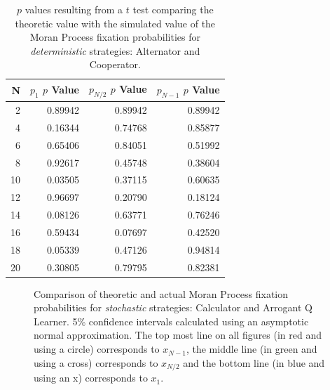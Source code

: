 \documentclass[10pt,letterpaper]{article}
\begin{document}
\begin{table}[!hbtp]
    \centering

        \begin{tabular}{rrrr}
        \toprule
          N &  $p_1$ $p$ Value &  $p_{N / 2}$ $p$ Value &  $p_{N - 1}$ $p$ Value \\
        \midrule
          2 &          0.89942 &                0.89942 &                0.89942 \\
          4 &          0.16344 &                0.74768 &                0.85877 \\
          6 &          0.65406 &                0.84051 &                0.51992 \\
          8 &          0.92617 &                0.45748 &                0.38604 \\
         10 &          0.03505 &                0.37115 &                0.60635 \\
         12 &          0.96697 &                0.20790 &                0.18124 \\
         14 &          0.08126 &                0.63771 &                0.76246 \\
         16 &          0.59434 &                0.07697 &                0.42520 \\
         18 &          0.05339 &                0.47126 &                0.94814 \\
         20 &          0.30805 &                0.79795 &                0.82381 \\
        \bottomrule
        \end{tabular}

    \caption{\(p\) values resulting from a $t$ test comparing the theoretic
        value with the simulated value of the Moran Process fixation
        probabilities for \textit{deterministic} strategies: Alternator and
    Cooperator.}
    \label{tab:comparison_deterministic}
\end{table}

\begin{figure}[!hbtp]
    \centering
    \caption{Comparison of theoretic and actual Moran Process
             fixation probabilities for \textit{stochastic} strategies:
             Calculator and Arrogant Q Learner. 5\% confidence intervals calculated using an asymptotic
     normal approximation.
The top most line on all figures (in red and using a circle) corresponds to
\(x_{N-1}\), the middle line (in green and using a cross) corresponds to
\(x_{N/2}\) and the bottom line (in blue and using an x) corresponds to
\(x_{1}\).}
    \label{fig:comparison_stochastic}
\end{figure}
\end{document}
